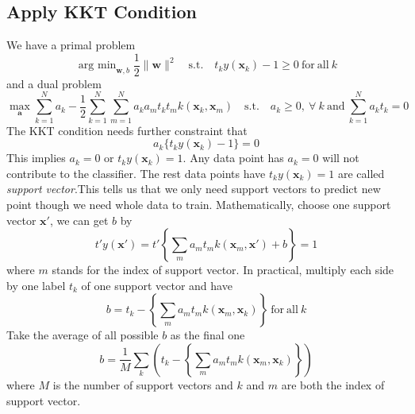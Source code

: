 \documentclass{article}
\DeclareMathOperator*{\argmin}{arg~min}
\begin{document}
        \subsection{Apply KKT Condition}
            We have a primal problem
            \[
                \argmin_{\mathbf{w},b} \frac{1}{2} \|\mathbf{w}\|^2 \mathrm{\quad s.t. \quad} t_k y(\mathbf{x}_k) -1 \geq 0 \mathrm{~for~all~}k
            \]
            and a dual problem
            \[
                \max_{\mathbf{a}}\sum_{k=1}^N a_k - \frac{1}{2} \sum_{k=1}^N \sum_{m=1}^N a_k a_m t_k t_m k(\mathbf{x}_k, \mathbf{x}_m) \mathrm{\quad s.t. \quad} a_k \geq 0,~\forall~k\mathrm{~and~}\sum_{k=1}^N a_k t_k = 0
            \]
            The KKT condition needs further constraint that
            \[
                a_k \{t_k y(\mathbf{x}_k) - 1\} = 0
            \]
            This implies $a_k=0$ or $t_k y(\mathbf{x}_k)=1$. Any data point has $a_k=0$ will not contribute to the classifier. The rest data points have $t_k y(\mathbf{x}_k)=1$ are called \textit{support vector}.This tells us that we only need support vectors to predict new point though we need whole data to train. Mathematically, choose one support vector $\mathbf{x}'$, we can get $b$ by
            \[
                t' y(\mathbf{x}') = t'\left\{ \sum_{m} a_m t_m k(\mathbf{x}_m, \mathbf{x}') + b \right\} = 1
            \]
            where $m$ stands for the index of support vector. In practical, multiply each side by one label $t_k$ of one  support vector and have
            \[
                b = t_k - \left\{ \sum_m a_m t_m k(\mathbf{x}_m, \mathbf{x}_k) \right\} \mathrm{~for~all~}k
            \]
            Take the average of all possible $b$ as the final one
            \[
                b = \frac{1}{M} \sum_{k}\left(t_k - \left\{ \sum_m a_m t_m k(\mathbf{x}_m, \mathbf{x}_k) \right\}\right)
            \]
            where $M$ is the number of support vectors and $k$ and $m$ are both the index of support vector.
\end{document}
